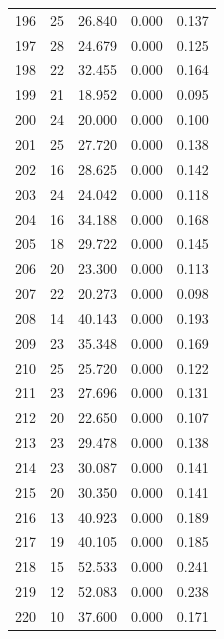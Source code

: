 \begin{table}
\begin{tabular}{rrrrr}
 196 &     25 &         26.840 &        0.000 &           0.137 \\
 197 &     28 &         24.679 &        0.000 &           0.125 \\
 198 &     22 &         32.455 &        0.000 &           0.164 \\
 199 &     21 &         18.952 &        0.000 &           0.095 \\
 200 &     24 &         20.000 &        0.000 &           0.100 \\
 201 &     25 &         27.720 &        0.000 &           0.138 \\
 202 &     16 &         28.625 &        0.000 &           0.142 \\
 203 &     24 &         24.042 &        0.000 &           0.118 \\
 204 &     16 &         34.188 &        0.000 &           0.168 \\
 205 &     18 &         29.722 &        0.000 &           0.145 \\
 206 &     20 &         23.300 &        0.000 &           0.113 \\
 207 &     22 &         20.273 &        0.000 &           0.098 \\
 208 &     14 &         40.143 &        0.000 &           0.193 \\
 209 &     23 &         35.348 &        0.000 &           0.169 \\
 210 &     25 &         25.720 &        0.000 &           0.122 \\
 211 &     23 &         27.696 &        0.000 &           0.131 \\
 212 &     20 &         22.650 &        0.000 &           0.107 \\
 213 &     23 &         29.478 &        0.000 &           0.138 \\
 214 &     23 &         30.087 &        0.000 &           0.141 \\
 215 &     20 &         30.350 &        0.000 &           0.141 \\
 216 &     13 &         40.923 &        0.000 &           0.189 \\
 217 &     19 &         40.105 &        0.000 &           0.185 \\
 218 &     15 &         52.533 &        0.000 &           0.241 \\
 219 &     12 &         52.083 &        0.000 &           0.238 \\
 220 &     10 &         37.600 &        0.000 &           0.171 \\

\end{tabular}
\end{table}
